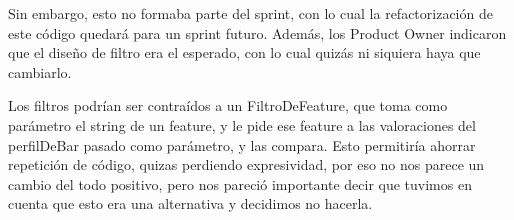 Sin embargo, esto no formaba parte del sprint, con lo cual la refactorización de este código quedará para un sprint futuro. Además, los Product Owner indicaron que el diseño de filtro era el esperado, con lo cual quizás ni siquiera haya que cambiarlo.

Los filtros podrían ser contraídos a un FiltroDeFeature, que toma como parámetro el string de un feature, y le pide ese feature a las valoraciones del perfilDeBar pasado como parámetro, y las compara. Esto permitiría ahorrar repetición de código, quizas perdiendo expresividad, por eso no nos parece un cambio del todo positivo, pero nos pareció importante decir que tuvimos en cuenta que esto era una alternativa y decidimos no hacerla.


